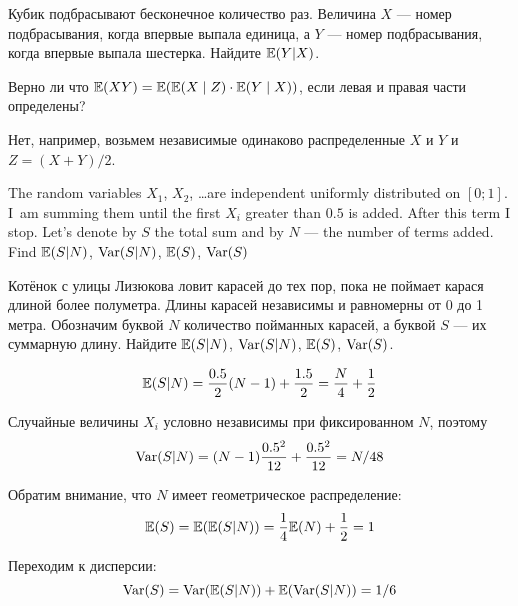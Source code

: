 \begin{problem}
Кубик подбрасывают бесконечное количество раз. Величина $X$ — номер подбрасывания, когда впервые выпала единица, а $Y$ — номер подбрасывания, когда впервые выпала шестерка. Найдите $\mathbb{E}(Y|X)$.

\begin{sol}

\end{sol}
\end{problem}

\begin{problem}
Верно ли что $\mathbb{E}(XY)=\mathbb{E}(\mathbb{E}(X\mid Z)\cdot \mathbb{E}(Y\mid X))$, если левая и правая части определены?

\begin{sol}
Нет, например, возьмем независимые одинаково распределенные $X$ и $Y$ и $Z=(X+Y)/2$.
\end{sol}
\end{problem}

\begin{problem}
The random variables $X_1$, $X_2$, \ldots are independent uniformly distributed on $[0;1]$. I~am summing them until the first $X_i$ greater than $0.5$ is added. After this term I stop. Let's denote by $S$ the total sum and by $N$ — the number of terms added. Find $\mathbb{E}(S|N)$, $\operatorname{Var}(S|N)$, $\mathbb{E}(S)$, $\operatorname{Var}(S)$

Котёнок с улицы Лизюкова ловит карасей до тех пор, пока не поймает карася длиной более полуметра. Длины карасей независимы и равномерны от 0 до 1 метра. Обозначим буквой $N$ количество пойманных карасей, а буквой $S$ — их суммарную длину. Найдите $\mathbb{E}(S|N)$, $\operatorname{Var}(S|N)$, $\mathbb{E}(S)$, $\operatorname{Var}(S)$.

\begin{sol}
\[
\mathbb{E}(S|N)= \frac{0.5}{2} (N-1) + \frac{1.5}{2} = \frac{N}{4}+\frac{1}{2}
\]

Случайные величины $X_i$ условно независимы при фиксированном $N$, поэтому
\[
\operatorname{Var}(S|N) = (N-1)\frac{0.5^2}{12} + \frac{0.5^2}{12} = N/48
\]

Обратим внимание, что $N$ имеет геометрическое распределение:
\[
\mathbb{E}(S)=\mathbb{E}(\mathbb{E}(S|N))=\frac{1}{4}\mathbb{E}(N)+\frac{1}{2}=1
\]

Переходим к дисперсии:
\[
\operatorname{Var}(S)=\operatorname{Var}(\mathbb{E}(S|N)) + \mathbb{E}(\operatorname{Var}(S|N)) = 1/6
\]


\end{sol}
\end{problem}


